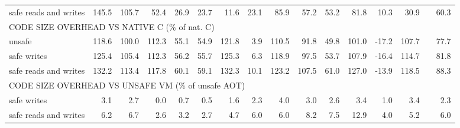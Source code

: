 \begin{landscape}
\begin{table}
\begin{tabular}{lrrrrrrrrrrrrrrr}
    safe reads and writes               &      145.5 &      105.7 &       52.4 &       26.9 &       23.7 &       11.6 &       23.1 &       85.9 &       57.2 &       53.2 &       81.8 &       10.3 &       30.9 &                   &      60.3 \\
    \multicolumn{10}{l}{CODE SIZE OVERHEAD VS NATIVE C (\% of nat. C)} \\
    unsafe                              &      118.6 &      100.0 &      112.3 &       55.1 &       54.9 &      121.8 &        3.9 &      110.5 &       91.8 &       49.8 &      101.0 &      -17.2 &      107.7 &                   &      77.7 \\
    safe writes                         &      125.4 &      105.4 &      112.3 &       56.2 &       55.7 &      125.3 &        6.3 &      118.9 &       97.5 &       53.7 &      107.9 &      -16.4 &      114.7 &                   &      81.8 \\
    safe reads and writes               &      132.2 &      113.4 &      117.8 &       60.1 &       59.1 &      132.3 &       10.1 &      123.2 &      107.5 &       61.0 &      127.0 &      -13.9 &      118.5 &                   &      88.3 \\
    \multicolumn{10}{l}{CODE SIZE OVERHEAD VS UNSAFE VM (\% of unsafe AOT)} \\
    safe writes                         &        3.1 &        2.7 &        0.0 &        0.7 &        0.5 &        1.6 &        2.3 &        4.0 &        3.0 &        2.6 &        3.4 &        1.0 &        3.4 &                   &       2.3 \\
    safe reads and writes               &        6.2 &        6.7 &        2.6 &        3.2 &        2.7 &        4.7 &        6.0 &        6.0 &        8.2 &        7.5 &       12.9 &        4.0 &        5.2 &                   &       6.0 \\
    \bottomrule
    \end{tabular}
\end{table}
\end{landscape}
